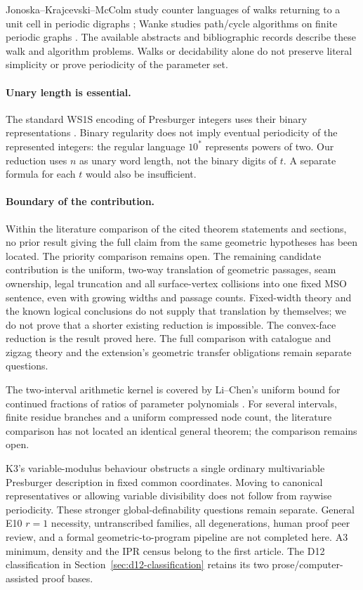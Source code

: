 \documentclass[11pt]{amsart}
\theoremstyle{definition}\newtheorem{definition}{Definition}
\begin{document}
Jonoska--Krajcevski--McColm study counter languages of walks returning
to a unit cell in periodic digraphs \cite{Counter}; Wanke studies
path/cycle algorithms on finite periodic graphs \cite{Wanke}.
The available abstracts and bibliographic records describe these
walk and algorithm problems. Walks or
decidability alone do not preserve literal simplicity or prove
periodicity of the parameter set.

\paragraph{Unary length is essential.}
The standard WS1S encoding of Presburger integers uses their binary
representations \cite[printed pp.~11--12]{Thomas}. Binary regularity
does not imply eventual periodicity of the represented integers:
the regular language $10^*$ represents powers of two. Our reduction
uses $n$ as unary word length, not the binary digits of $t$.
A separate formula for each $t$ would also be insufficient.

\paragraph{Boundary of the contribution.}
Within the literature comparison of the cited theorem statements
and sections, no prior result giving the full claim from the same
geometric hypotheses has been located. The priority comparison remains
open. The
remaining candidate contribution is the uniform, two-way translation
of geometric passages, seam ownership, legal truncation and all
surface-vertex collisions into one fixed MSO sentence, even with
growing widths and passage counts. Fixed-width theory and the known
logical conclusions do not supply that translation by themselves;
we do not prove that a shorter existing reduction is impossible.
The convex-face reduction is the result proved here. The full
comparison with catalogue and zigzag theory and the extension's
geometric transfer obligations remain separate questions.

The two-interval arithmetic kernel is covered by Li--Chen's uniform
bound for continued fractions of ratios of parameter polynomials
\cite[Theorem 27]{LiChen}. For several intervals, finite residue
branches and a uniform compressed node count, the literature comparison has not located an identical general theorem;
the comparison remains open.

K3's variable-modulus behaviour obstructs a single ordinary
multivariable Presburger description in fixed common coordinates.
Moving to canonical representatives or allowing variable divisibility
does not follow from raywise periodicity. These stronger global-definability questions remain separate. General E10 $r=1$ necessity, untranscribed
families, all degenerations, human proof peer review, and a formal
geometric-to-program pipeline are not completed here. A3 minimum,
density and the IPR census belong to the first article. The D12 classification in Section~\ref{sec:d12-classification} retains its two prose/computer-assisted proof bases.
\end{document}
